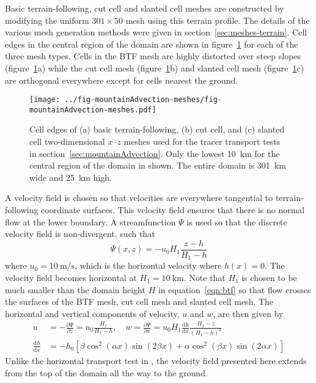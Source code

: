 Basic terrain-following, cut cell and slanted cell meshes are constructed by modifying the uniform $301 \times 50$ mesh using this terrain profile.  The details of the various mesh generation methods were given in section~\ref{sec:meshes-terrain}.  Cell edges in the central region of the domain are shown in figure~\ref{fig:mountainAdvection-meshes} for each of the three mesh types.
Cells in the BTF mesh are highly distorted over steep slopes (figure~\ref{fig:mountainAdvection-meshes}a) while the cut cell mesh (figure~\ref{fig:mountainAdvection-meshes}b) and slanted cell mesh (figure~\ref{fig:mountainAdvection-meshes}c) are orthogonal everywhere except for cells nearest the ground.

\begin{figure}
	\centering
	\texttt{[image: ../fig-mountainAdvection-meshes/fig-mountainAdvection-meshes.pdf]}
	\caption{Cell edges of (a) basic terrain-following, (b) cut cell, and (c) slanted cell two-dimensional $x$--$z$ meshes used for the tracer transport tests in section~\ref{sec:mountainAdvection}.  Only the lowest \SI{10}{\kilo\meter} for the central region of the domain in shown.  The entire domain is \SI{301}{\kilo\meter} wide and \SI{25}{\kilo\meter} high.}
	\label{fig:mountainAdvection-meshes}
\end{figure}

A velocity field is chosen so that velocities are everywhere tangential to terrain-following coordinate surfaces.  This velocity field ensures that there is no normal flow at the lower boundary.  A streamfunction $\Psi$ is used so that the discrete velocity field is non-divergent, such that
\begin{equation}
	\Psi(x,z) = -u_0 H_1 \frac{z - h}{H_1 - h} \label{eqn:streamfunc-btf}
\end{equation}
where $u_0 = \SI{10}{\meter\per\second}$, which is the horizontal velocity where $h(x) = 0$.  The velocity field becomes horizontal at $H_1 = \SI{10}{\kilo\meter}$.  Note that $H_1$ is chosen to be much smaller than the domain height $H$ in equation~\eqref{eqn:btf} so that flow crosses the surfaces of the BTF mesh, cut cell mesh and slanted cell mesh.
The horizontal and vertical components of velocity, $u$ and $w$, are then given by
\begin{align}
	u &= -\frac{\partial \Psi}{\partial z} = u_0 \frac{H_1}{H_1 - h}, \quad w = \frac{\partial \Psi}{\partial x} = u_0 H_1 \frac{\mathrm{d} h}{\mathrm{d} x} \frac{H_1 - z}{\left( H_1 - h \right)^2} \label{eqn:uw-btf} \\
	\frac{\mathrm{d} h}{\mathrm{d} x} &= - h_0 \left[ 
		\beta \cos^2 \left( \alpha x \right) \sin \left( 2 \beta x \right) +
		\alpha \cos^2 \left( \beta x \right) \sin \left( 2 \alpha x \right)
	\right]
\end{align}
Unlike the horizontal transport test in \citep{schaer2002}, the velocity field presented here extends from the top of the domain all the way to the ground.  


